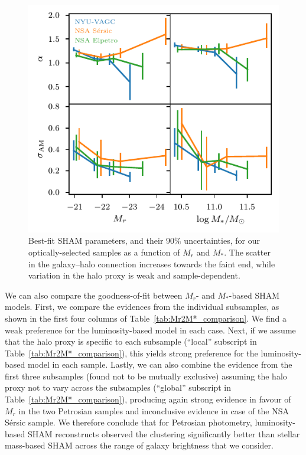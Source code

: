 \documentclass[usenatbib,useAMS]{mnras}
\begin{document}
\begin{figure}
    \centering
    \includegraphics[width=1.0\columnwidth]{Figures/LF_SMF_dependence.pdf}
    \caption{Best-fit \ac{SHAM} parameters, and their $90\%$ uncertainties, for our optically-selected samples as a function of $M_r$ and $M_*$. The scatter in the galaxy--halo connection increases towards the faint end, while variation in the halo proxy is weak and sample-dependent.}
    \label{fig:LF_SMF_dependence}
\end{figure}


We can also compare the goodness-of-fit between $M_r$- and $M_*$-based \ac{SHAM} models. First, we compare the evidences from the individual subsamples, as shown in the first four columns of Table~\ref{tab:Mr2M*_comparison}. We find a weak preference for the luminosity-based model in each case. Next, if we assume that the halo proxy is specific to each subsample (``local'' subscript in Table~\ref{tab:Mr2M*_comparison}), this yields strong preference for the luminosity-based model in each sample. Lastly, we can also combine the evidence from the first three subsamples (found not to be mutually exclusive) assuming the halo proxy not to vary across the subsamples (``global'' subscript in Table~\ref{tab:Mr2M*_comparison}), producing again strong evidence in favour of $M_r$ in the two Petrosian samples and inconclusive evidence in case of the \ac{NSA} S\'ersic sample. We therefore conclude that for Petrosian photometry, luminosity-based \ac{SHAM} reconstructs observed the clustering significantly better than stellar mass-based \ac{SHAM} across the range of galaxy brightness that we consider.
\end{document}
